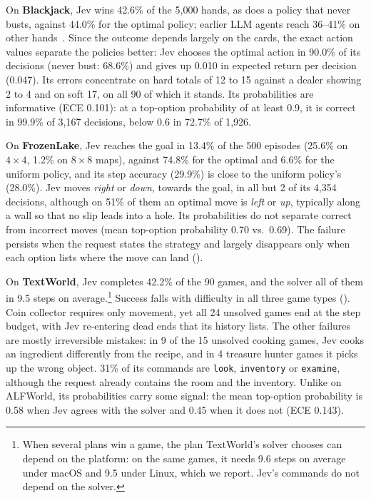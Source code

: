 \documentclass[table]{article}
\begin{document}
On \textbf{Blackjack}, Jev wins 42.6\% of the 5{,}000 hands, as does a policy that never busts, against 44.0\% for the optimal policy; earlier LLM agents reach 36--41\% on other hands~\cite{zhang2024agentpro}. Since the outcome depends largely on the cards, the exact action values separate the policies better: Jev chooses the optimal action in 90.0\% of its decisions (never bust: 68.6\%) and gives up 0.010 in expected return per decision (0.047). Its errors concentrate on hard totals of 12 to 15 against a dealer showing 2 to 4 and on soft 17, on all 90 of which it stands. Its probabilities are informative (ECE 0.101): at a top-option probability of at least 0.9, it is correct in 99.9\% of 3{,}167 decisions, below 0.6 in 72.7\% of 1{,}926.


On \textbf{FrozenLake}, Jev reaches the goal in 13.4\% of the 500 episodes (25.6\% on $4{\times}4$, 1.2\% on $8{\times}8$ maps), against 74.8\% for the optimal and 6.6\% for the uniform policy, and its step accuracy (29.9\%) is close to the uniform policy's (28.0\%). Jev moves \emph{right} or \emph{down}, towards the goal, in all but 2 of its 4{,}354 decisions, although on 51\% of them an optimal move is \emph{left} or \emph{up}, typically along a wall so that no slip leads into a hole. Its probabilities do not separate correct from incorrect moves (mean top-option probability 0.70 vs.\ 0.69). The failure persists when the request states the strategy and largely disappears only when each option lists where the move can land ().


On \textbf{TextWorld}, Jev completes 42.2\% of the 90 games, and the solver all of them in 9.5 steps on average.\footnote{When several plans win a game, the plan TextWorld's solver chooses can depend on the platform: on the same games, it needs 9.6 steps on average under macOS and 9.5 under Linux, which we report. Jev's commands do not depend on the solver.} Success falls with difficulty in all three game types (). Coin collector requires only movement, yet all 24 unsolved games end at the step budget, with Jev re-entering dead ends that its history lists. The other failures are mostly irreversible mistakes: in 9 of the 15 unsolved cooking games, Jev cooks an ingredient differently from the recipe, and in 4 treasure hunter games it picks up the wrong object. 31\% of its commands are \texttt{look}, \texttt{inventory} or \texttt{examine}, although the request already contains the room and the inventory. Unlike on ALFWorld, its probabilities carry some signal: the mean top-option probability is 0.58 when Jev agrees with the solver and 0.45 when it does not (ECE 0.143).
\end{document}
